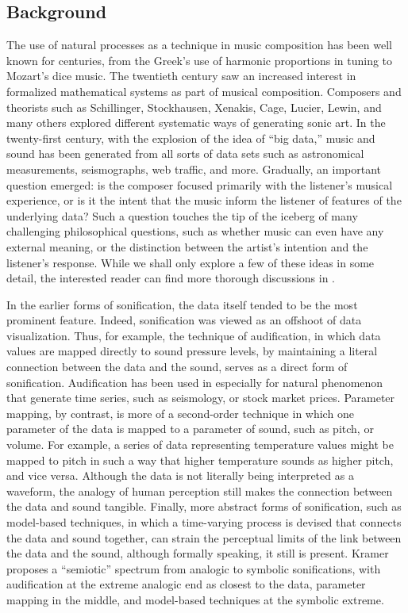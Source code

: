\subsection{Background}
\label{sec:background}
The use of natural processes as a technique in music composition has been 
well known for centuries, from the Greek's use of harmonic proportions in 
tuning to Mozart's dice music. The twentieth century saw an increased 
interest in formalized mathematical systems as part of musical composition. 
Composers and theorists such as Schillinger, Stockhausen, Xenakis, Cage, 
Lucier, Lewin, and many others explored different systematic ways of 
generating sonic art. In the twenty-first century, with the explosion of the 
idea of ``big data,'' music and sound has been generated from all sorts of 
data sets such as astronomical measurements, seismographs, web traffic, and 
more. Gradually, an important question emerged: is the composer focused 
primarily with the listener's musical experience, or is it the intent that 
the music inform the listener of features of the underlying data? Such a 
question touches the tip of the iceberg of many challenging philosophical 
questions, such as whether music can even have any external meaning, or the 
distinction between the artist's intention and the listener's response. While 
we shall only explore a few of these ideas in some detail, the interested 
reader can find more thorough discussions in .

In the earlier forms of sonification, the data itself tended to be the most 
prominent feature. Indeed, sonification was viewed as an offshoot of data 
visualization. Thus, for example, the technique of audification, in which 
data values are mapped directly to sound pressure levels, by maintaining a 
literal connection between the data and the sound, serves as a direct form of 
sonification. Audification has been used in especially for natural phenomenon 
that generate time series, such as seismology, or stock market prices. 
Parameter mapping, by contrast, is more of a second-order technique in which 
one parameter of the data is mapped to a parameter of sound, such as pitch, 
or volume. For example, a series of data representing temperature values 
might be mapped to pitch in such a way that higher temperature sounds as 
higher pitch, and vice versa. Although the data is not literally being 
interpreted as a waveform, the analogy of human perception still makes the 
connection between the data and sound tangible. Finally, more abstract forms 
of sonification, such as model-based techniques, in which a time-varying 
process is devised that connects the data and sound together, can strain the 
perceptual limits of the link between the data and the sound, although 
formally speaking, it still is present. Kramer proposes a ``semiotic'' 
spectrum from analogic to symbolic sonifications, with audification at the 
extreme analogic end as closest to the data, parameter mapping in the middle, 
and model-based techniques at the symbolic extreme.

